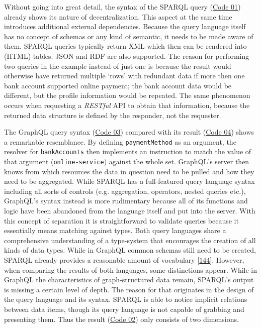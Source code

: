 \documentclass[12pt,english,a4paper,titlepage,cleardoublepage=empty,dottedtoc]{report}
\begin{document}
Without going into great detail, the syntax of the SPARQL query
(\protect\hyperlink{code-01_sparql-query}{Code 01}) already shows its
nature of decentralization. This aspect at the same time introduces
additional external dependencies. Because the query language itself has
no concept of schemas or any kind of semantic, it needs to be made aware
of them. SPARQL queries typically return XML which then can be rendered
into (HTML) tables. JSON and RDF are also supported. The reason for
performing two queries in the example instead of just one is because the
result would otherwise have returned multiple `rows' with redundant data
if more then one bank account supported online payment; the bank account
data would be different, but the profile information would be repeated.
The same phenomenon occurs when requesting a \emph{RESTful} API to
obtain that information, because the returned data structure is defined
by the responder, not the requester.

The GraphQL query syntax (\protect\hyperlink{code-03_graphql-query}{Code
03}) compared with its result
(\protect\hyperlink{code-04_graphql-query-result}{Code 04}) shows a
remarkable resemblance. By defining \texttt{paymentMethod} as an
argument, the resolver for \texttt{bankAccounts} then implements an
instruction to match the value of that argument
(\texttt{\textquotesingle{}online-service\textquotesingle{}}) against
the whole set. GraphQL's server then knows from which resources the data
in question need to be pulled and how they need to be aggregated. While
SPARQL has a full-featured query language syntax including all sorts of
controls (e.g. aggregation, operators, nested queries etc.), GraphQL's
syntax instead is more rudimentary because all of its functions and
logic have been abandoned from the language itself and put into the
server. With this concept of separation it is straightforward to
validate queries because it essentially means matching against types.
Both query languages share a comprehensive understanding of a
type-system that encourages the creation of all kinds of data types.
While in GraphQL common schemas still need to be created, SPARQL already
provides a reasonable amount of vocabulary
{[}\protect\hyperlink{ref-web_w3c-tr_rdf-schemas}{144}{]}. However, when
comparing the results of both languages, some distinctions appear. While
in GraphQL the characteristics of graph-structured data remain, SPARQL's
output is missing a certain level of depth. The reason for that
originates in the design of the query language and its syntax. SPARQL is
able to notice implicit relations between data items, though its query
language is not capable of grabbing and presenting them. Thus the result
(\protect\hyperlink{code-02_sparql-query-results}{Code 02}) only
consists of two dimensions.
\end{document}
